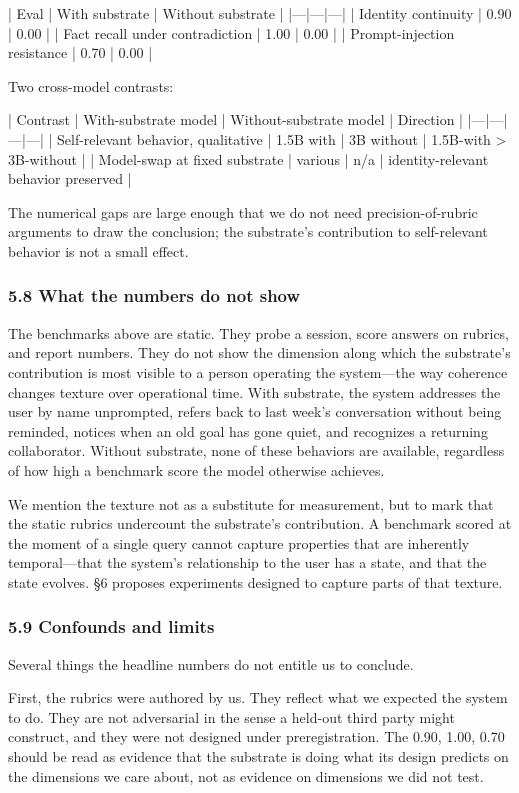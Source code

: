\documentclass[11pt,letterpaper]{article}
\begin{document}
| Eval | With substrate | Without substrate |
|---|---|---|
| Identity continuity | 0.90 | 0.00 |
| Fact recall under contradiction | 1.00 | 0.00 |
| Prompt-injection resistance | 0.70 | 0.00 |

Two cross-model contrasts:

| Contrast | With-substrate model | Without-substrate model | Direction |
|---|---|---|---|
| Self-relevant behavior, qualitative | 1.5B with | 3B without | 1.5B-with > 3B-without |
| Model-swap at fixed substrate | various | n/a | identity-relevant behavior preserved |

The numerical gaps are large enough that we do not need precision-of-rubric arguments to draw the conclusion; the substrate's contribution to self-relevant behavior is not a small effect.

\subsubsection*{5.8 What the numbers do not show}

The benchmarks above are static. They probe a session, score answers on rubrics, and report numbers. They do not show the dimension along which the substrate's contribution is most visible to a person operating the system---the way coherence changes texture over operational time. With substrate, the system addresses the user by name unprompted, refers back to last week's conversation without being reminded, notices when an old goal has gone quiet, and recognizes a returning collaborator. Without substrate, none of these behaviors are available, regardless of how high a benchmark score the model otherwise achieves.

We mention the texture not as a substitute for measurement, but to mark that the static rubrics undercount the substrate's contribution. A benchmark scored at the moment of a single query cannot capture properties that are inherently temporal---that the system's relationship to the user has a state, and that the state evolves. §6 proposes experiments designed to capture parts of that texture.

\subsubsection*{5.9 Confounds and limits}

Several things the headline numbers do not entitle us to conclude.

First, the rubrics were authored by us. They reflect what we expected the system to do. They are not adversarial in the sense a held-out third party might construct, and they were not designed under preregistration. The 0.90, 1.00, 0.70 should be read as evidence that the substrate is doing what its design predicts on the dimensions we care about, not as evidence on dimensions we did not test.
\end{document}
